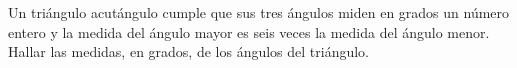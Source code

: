 Un triángulo acutángulo cumple que sus tres ángulos miden en grados un número entero y la medida del ángulo mayor es seis veces la medida del ángulo menor. Hallar las medidas, en grados, de los ángulos del triángulo.